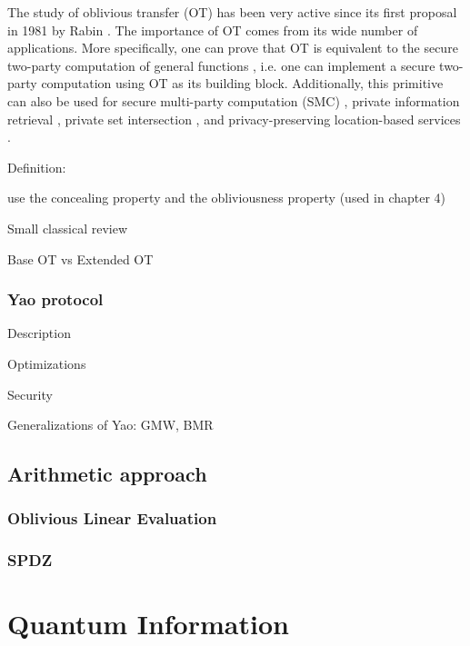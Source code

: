 The study of oblivious transfer (OT) has been very active since its first proposal in 1981 by Rabin \cite{Rabin81}. The importance of OT comes from its wide number of applications. More specifically, one can prove that OT is equivalent to the secure two-party computation of general functions \cite{Y86, K88}, i.e. one can implement a secure two-party computation using OT as its building block. Additionally, this primitive can also be used for secure multi-party computation (SMC) \cite{KOS16}, private information retrieval \cite{Che04}, private set intersection \cite{MEP17}, and privacy-preserving location-based services \cite{BHM+19}. 









Definition:

use the concealing property and the obliviousness property (used in chapter 4)

Small classical review 

Base OT vs Extended OT

\subsubsection{Yao protocol}

Description

Optimizations

Security

Generalizations of Yao: GMW, BMR

\subsection{Arithmetic approach}

\subsubsection{Oblivious Linear Evaluation}

\subsubsection{SPDZ}





\section{Quantum Information}

